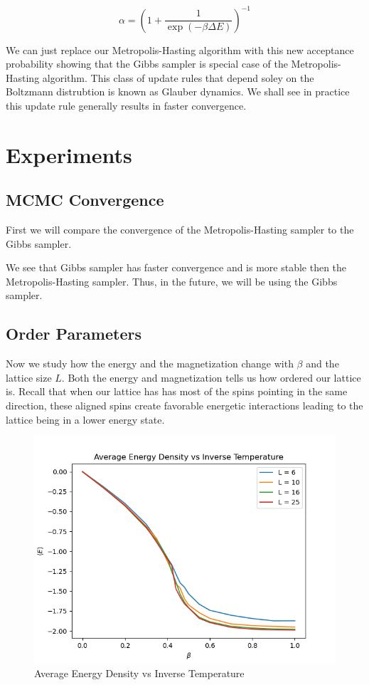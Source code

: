 \documentclass{article}
\begin{document}
\begin{equation}
    \alpha = \left(1 + \frac{1}{\exp(-\beta \Delta E)}\right)^{-1}
\end{equation}

We can just replace our Metropolis-Hasting algorithm with this new acceptance probability showing that the Gibbs sampler is special case of the Metropolis-Hasting algorithm. 
This class of update rules that depend soley on the Boltzmann distrubtion is known as Glauber dynamics. We shall see in practice this update rule generally results in faster convergence.


\section{Experiments}
\subsection{MCMC Convergence}
    First we will compare the convergence of the Metropolis-Hasting sampler to the Gibbs sampler.

    We see that Gibbs sampler has faster convergence and is more stable then the Metropolis-Hasting sampler. Thus, in the future,
    we will be using the Gibbs sampler.
\subsection{Order Parameters}

Now we study how the energy and the magnetization change with $\beta$ and the lattice size $L$. 
Both the energy and magnetization tells us how ordered our lattice is. Recall that when our lattice has
has most of the spins pointing in the same direction, these aligned spins create favorable energetic interactions
leading to the lattice being in a lower energy state.

\begin{figure}[ht]
    \includegraphics[width=\columnwidth]{plots/avg_energy_vs_beta.png}
    \caption{Average Energy Density vs Inverse Temperature}
    \label{fig:3}
\end{figure}
\end{document}

